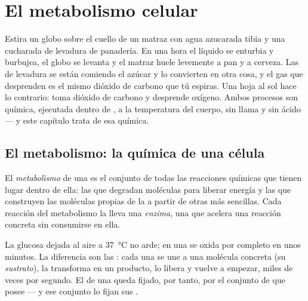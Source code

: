 \chapter{El metabolismo celular}\label{ch:g10:cell-metabolism}

Estira un globo sobre el cuello de un matraz con agua azucarada tibia y
una cucharada de levadura de panadería. En una hora el líquido se
enturbia y burbujea, el globo se levanta y el matraz huele levemente a
pan y a cerveza. Las  de levadura se están comiendo el azúcar y
lo convierten en otra cosa, y el gas que desprenden es el mismo dióxido
de carbono que tú espiras. Una hoja al sol hace lo contrario: toma
dióxido de carbono y desprende oxígeno. Ambos procesos son química,
ejecutada dentro de , a la temperatura del cuerpo, sin llama y
sin ácido --- y este capítulo trata de esa química.

\section{El metabolismo: la química de una célula}

\begin{definition}[Metabolismo]\label{def:g10:cell-metabolism:metabolism}
El \emph{metabolismo} de una  es el conjunto
de todas las reacciones químicas que tienen lugar dentro de ella: las
que degradan moléculas para liberar energía y las que construyen las
moléculas propias de la  a partir de otras más sencillas. Cada
reacción del metabolismo la lleva una \emph{enzima}, una
 que acelera una reacción concreta sin consumirse en ella.
\end{definition}

\begin{proposition}\label{prop:g10:cell-metabolism:enzymes}
La glucosa dejada al aire a \qty{37}{\celsius} no arde; en una 
se oxida por completo en unos minutos. La diferencia son las :
cada una se une a una molécula concreta (su \emph{sustrato}), la
transforma en un producto, lo libera y vuelve a empezar, miles de veces
por segundo. El  de una  queda fijado, por tanto, por
el conjunto de  que posee --- y ese conjunto lo fijan sus .
\end{proposition}
\admitted

